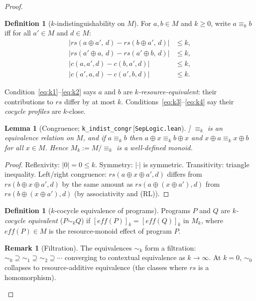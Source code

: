 \documentclass[acmsmall,sigplan,anonymous,review,screen]{acmart}
\theoremstyle{plain}
\newtheorem{lemma}[theorem]{Lemma}
\theoremstyle{definition}
\newtheorem{definition}[theorem]{Definition}
\newtheorem{remark}[theorem]{Remark}
\newcommand{\rs}{\mathit{rs}}
\newcommand{\lean}[1]{\texttt{#1}}
\newcommand{\leancite}[2]{\lean{#1}\,[\texttt{#2}]}
\begin{document}
\begin{proof}
\begin{definition}[$k$-indistinguishability on $M$]
\label{def:kindist}
  For $a, b \in M$ and $k \geq 0$, write $a \equiv_k b$ iff for all
  $a' \in M$ and $d \in M$:
  \begin{align}
    |\rs(a \oplus a',\, d) - \rs(b \oplus a',\, d)| &\leq k, \label{eq:k1}\\
    |\rs(a' \oplus a,\, d) - \rs(a' \oplus b,\, d)| &\leq k, \label{eq:k2}\\
    |c(a, a', d) - c(b, a', d)| &\leq k, \label{eq:k3}\\
    |c(a', a, d) - c(a', b, d)| &\leq k. \label{eq:k4}
  \end{align}
\end{definition}

Condition~\eqref{eq:k1}--\eqref{eq:k2} says $a$ and $b$ are
\emph{$k$-resource-equivalent}: their contributions to $\rs$ differ by at
most $k$.  Conditions~\eqref{eq:k3}--\eqref{eq:k4} say their
\emph{cocycle profiles} are $k$-close.

\begin{lemma}[Congruence; \leancite{k\_indist\_congr}{SepLogic.lean}]
\label{lem:congr}
  $\equiv_k$ is an equivalence relation on $M$, and if $a \equiv_k b$
  then $a \oplus x \equiv_k b \oplus x$ and
  $x \oplus a \equiv_k x \oplus b$ for all $x \in M$.
  Hence $M_k := M / {\equiv_k}$ is a well-defined monoid.
\end{lemma}

\begin{proof}
  Reflexivity: $|0| = 0 \leq k$.
  Symmetry: $|\cdot|$ is symmetric.
  Transitivity: triangle inequality.
  Left/right congruence: $\rs(a \oplus x \oplus a', d)$ differs from
  $\rs(b \oplus x \oplus a', d)$ by the same amount as $\rs(a \oplus (x \oplus a'), d)$
  from $\rs(b \oplus (x \oplus a'), d)$ (by associativity and (RL)).
\end{proof}

\begin{definition}[$k$-cocycle equivalence of programs]
\label{def:kcoceq}
  Programs $P$ and $Q$ are \emph{$k$-cocycle equivalent} ($P \sim_k Q$)
  if $[\mathit{eff}(P)]_k = [\mathit{eff}(Q)]_k$ in $M_k$, where
  $\mathit{eff}(P) \in M$ is the resource-monoid effect of program $P$.
\end{definition}

\begin{remark}[Filtration]
  The equivalences $\sim_k$ form a filtration:
  $\sim_0 \supseteq \sim_1 \supseteq \sim_2 \supseteq \cdots$
  converging to contextual equivalence as $k \to \infty$.
  At $k = 0$, $\sim_0$ collapses to resource-additive equivalence
  (the classes where $\rs$ is a homomorphism).
\end{remark}


\end{proof}
\end{document}
